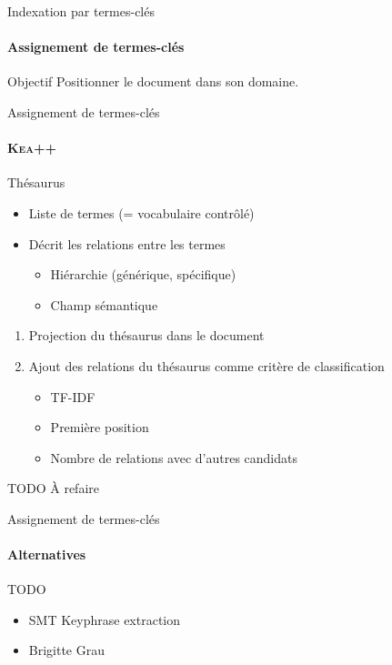 \begin{frame}{Indexation par termes-clés}\framesubtitle{Assignement de termes-clés}
  \begin{block}{Objectif}
    Positionner le document dans son domaine.
  \end{block}
\end{frame}

\begin{frame}{Assignement de termes-clés}\framesubtitle{\textsc{Kea}++~\cite{medelyan2006kea++}}
  \begin{block}{Thésaurus}
    \begin{itemize}
      \item{Liste de termes (= vocabulaire contrôlé)}
      \item{Décrit les relations entre les termes}
      \begin{itemize}
        \item{Hiérarchie (générique, spécifique)}
        \item{Champ sémantique}
      \end{itemize}
    \end{itemize}
  \end{block}

  \begin{enumerate}
    \item{Projection du thésaurus dans le document}
    \item{Ajout des relations du thésaurus comme critère de classification}
    \begin{itemize}
      \item{TF-IDF}
      \item{Première position}
      \item{Nombre de relations avec d'autres candidats}
    \end{itemize}
  \end{enumerate}

  \begin{alertblock}{TODO}
    À refaire
  \end{alertblock}
\end{frame}

\begin{frame}{Assignement de termes-clés}\framesubtitle{Alternatives}
  \begin{alertblock}{TODO}
    \begin{itemize}
      \item{SMT Keyphrase extraction}
      \item{Brigitte Grau}
    \end{itemize}
  \end{alertblock}
\end{frame}

